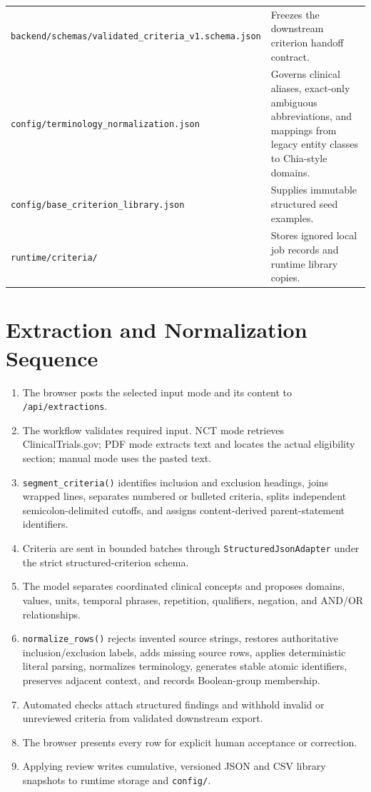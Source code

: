\documentclass[11pt]{article}
\newcommand{\code}[1]{\nolinkurl{#1}}
\begin{document}
\begin{longtable}{p{}p{}}
\code{backend/schemas/validated_criteria_v1.schema.json} & Freezes the downstream criterion handoff contract. \\
\code{config/terminology_normalization.json} & Governs clinical aliases, exact-only ambiguous abbreviations, and mappings from legacy entity classes to Chia-style domains. \\
\code{config/base_criterion_library.json} & Supplies immutable structured seed examples. \\
\code{runtime/criteria/} & Stores ignored local job records and runtime library copies. \\
\bottomrule
\end{longtable}

\section{Extraction and Normalization Sequence}

\begin{enumerate}
  \item The browser posts the selected input mode and its content to \code{/api/extractions}.
  \item The workflow validates required input. NCT mode retrieves ClinicalTrials.gov; PDF mode extracts text and locates the actual eligibility section; manual mode uses the pasted text.
  \item \code{segment_criteria()} identifies inclusion and exclusion headings, joins wrapped lines, separates numbered or bulleted criteria, splits independent semicolon-delimited cutoffs, and assigns content-derived parent-statement identifiers.
  \item Criteria are sent in bounded batches through \code{StructuredJsonAdapter} under the strict structured-criterion schema.
  \item The model separates coordinated clinical concepts and proposes domains, values, units, temporal phrases, repetition, qualifiers, negation, and AND/OR relationships.
  \item \code{normalize_rows()} rejects invented source strings, restores authoritative inclusion/exclusion labels, adds missing source rows, applies deterministic literal parsing, normalizes terminology, generates stable atomic identifiers, preserves adjacent context, and records Boolean-group membership.
  \item Automated checks attach structured findings and withhold invalid or unreviewed criteria from validated downstream export.
  \item The browser presents every row for explicit human acceptance or correction.
  \item Applying review writes cumulative, versioned JSON and CSV library snapshots to runtime storage and \code{config/}.
\end{enumerate}
\end{document}
